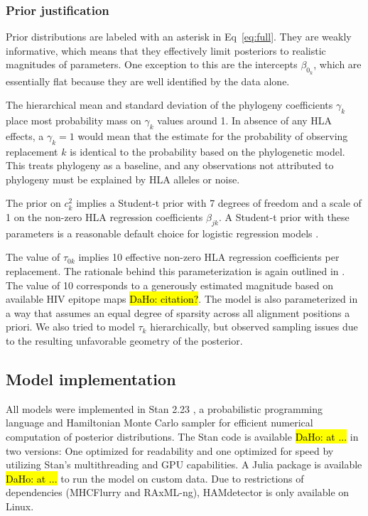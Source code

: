 \documentclass{bioinfo}
\begin{document}
\begin{methods}
\subsubsection{Prior justification}

Prior distributions are labeled with an asterisk in Eq~\ref{eq:full}. They are weakly informative, which means that they effectively limit posteriors to realistic magnitudes of parameters. One exception to this are the intercepts \(\beta_{0_k}\), which are essentially flat because they are well identified by the data alone. 

The hierarchical mean and standard deviation of the phylogeny coefficients \(\gamma_k\) place most probability mass on \(\gamma_k\) values around 1. In absence of any HLA effects, a $\gamma_k=1$ would mean that the estimate for the probability of observing replacement $k$ is identical to the probability based on the phylogenetic model. This treats phylogeny as a baseline, and any observations not attributed to phylogeny must be explained by HLA alleles or noise.

The prior on $c_k^2$ implies a Student-t prior with 7 degrees of freedom and a scale of 1 on the non-zero HLA regression coefficients \(\beta_{jk}\). A Student-t prior with these parameters is a reasonable default choice for logistic regression models \citep{Piironen2017}.

The value of \(\tau_{0k}\) implies 10 effective non-zero HLA regression coefficients per replacement. The rationale behind this parameterization is again outlined in \citet{Piironen2017}. The value of 10 corresponds to a generously estimated magnitude based on available HIV epitope maps \hl{DaHo: citation?}.
The model is also parameterized in a way that assumes an equal degree of sparsity across all alignment positions a priori. We also tried to model \(\tau_k\) hierarchically, but observed sampling issues due to the resulting unfavorable geometry of the posterior.


\subsection{Model implementation}
All models were implemented in Stan 2.23 \citep{Stan2021}, a probabilistic programming language and Hamiltonian Monte Carlo sampler for efficient numerical computation of posterior distributions. The Stan code is available \hl{DaHo: at ...} in two versions: One optimized for readability and one optimized for speed by utilizing Stan's multithreading and GPU capabilities. A Julia \citep{Bezanson2017} package is available \hl{DaHo: at ...} to run the model on custom data. Due to restrictions of dependencies (MHCFlurry and RAxML-ng), HAMdetector is only available on Linux. %



\end{methods}
\end{document}
